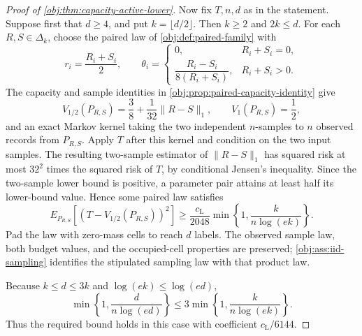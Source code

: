 \begin{proof}[Proof of \cref{obj:thm:capacity-active-lower}]
Now fix \(T,n,d\) as in the statement. Suppose first that \(d\ge4\), and put \(k=\lfloor d/2\rfloor\). Then \(k\ge2\) and \(2k\le d\). For each \(R,S\in\Delta_k\), choose the paired law of \cref{obj:def:paired-family} with
\[
r_i=\frac{R_i+S_i}{2},\qquad
\theta_i=
\begin{cases}
0,&R_i+S_i=0,\\[2pt]
\dfrac{R_i-S_i}{8(R_i+S_i)},&R_i+S_i>0.
\end{cases}
\] %
The capacity and sample identities in \cref{obj:prop:paired-capacity-identity} give
\[
V_{1/2}(P_{R,S})=\frac38+\frac1{32}\|R-S\|_1,
\qquad V_1(P_{R,S})=\frac12,
\] %
and an exact Markov kernel taking the two independent \(n\)-samples to \(n\) observed records from \(P_{R,S}\). Apply \(T\) after this kernel and condition on the two input samples. The resulting two-sample estimator of \(\|R-S\|_1\) has squared risk at most \(32^2\) times the squared risk of \(T\), by conditional Jensen’s inequality. Since the two-sample lower bound is positive, a parameter pair attains at least half its lower-bound value. Hence some paired law satisfies
\[
E_{P_{R,S}}\!\left[(T-V_{1/2}(P_{R,S}))^2\right]
\ge \frac{c_{\mathrm L}}{2048}
 \min\left\{1,\frac{k}{n\log(ek)}\right\}.
\] %
Pad the law with zero-mass cells to reach \(d\) labels. The observed sample law, both budget values, and the occupied-cell properties are preserved; \cref{obj:ass:iid-sampling} identifies the stipulated sampling law with that product law. %

Because \(k\le d\le3k\) and \(\log(ek)\le\log(ed)\),
\[
\min\left\{1,\frac{d}{n\log(ed)}\right\}
\le3\min\left\{1,\frac{k}{n\log(ek)}\right\}.
\] %
Thus the required bound holds in this case with coefficient \(c_{\mathrm L}/6144\). %


\end{proof}
